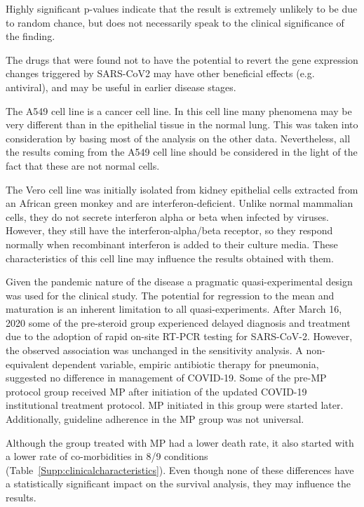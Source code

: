 Highly significant p-values indicate that the result is extremely unlikely to be due to random chance, but does not necessarily speak to the clinical significance of the finding. 

The drugs that were found not to have the potential to revert the gene expression changes triggered by SARS-CoV2 may have other beneficial effects (e.g. antiviral), and may be useful in earlier disease stages. 




The  A549 cell line  is a cancer cell line. In this cell line many phenomena may be very different than in the epithelial tissue in the normal lung. This was taken into consideration by basing most of the analysis on the other data. Nevertheless, all the results coming from the A549 cell line should be considered in the light of the fact that these are not normal cells. 

The Vero cell line was initially isolated from kidney epithelial cells extracted from an African green monkey and are interferon-deficient. Unlike normal mammalian cells, they do not secrete interferon alpha or beta when infected by viruses. However, they still have the interferon-alpha/beta receptor, so they respond normally when recombinant interferon is added to their culture media. These characteristics of this cell line may influence the results obtained with them. 

Given the pandemic nature of the disease a pragmatic quasi-experimental design was used for the clinical study. The potential for regression to the mean and maturation is an inherent limitation to all quasi-experiments. 
After March 16, 2020 some of the pre-steroid group experienced delayed diagnosis and treatment due to the adoption of rapid on-site RT-PCR testing for SARS-CoV-2. However, the observed association was unchanged in the sensitivity analysis.  A non-equivalent dependent variable, empiric antibiotic therapy for pneumonia, suggested no difference in management of COVID-19. 
Some of the pre-MP protocol group received MP after initiation of the updated COVID-19 institutional treatment protocol.  MP initiated in this group were started  later. Additionally, guideline adherence in the MP  group was not universal. 

Although the group treated with MP had a lower death rate, it also started with a lower rate of co-morbidities in 8/9 conditions (Table~\ref{Supp:clinicalcharacteristics}). Even though none of these differences have a statistically significant impact on the survival analysis, they may influence the results. 


